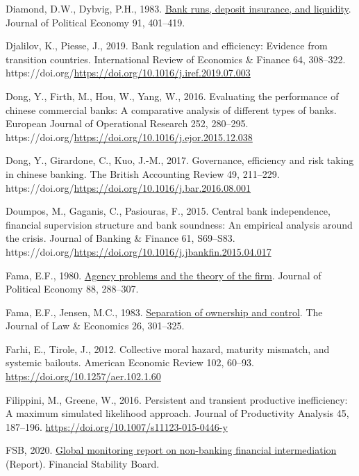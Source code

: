\documentclass[
  12pt,
  a4paper,
]{scrreprt}
\newlength{\cslhangindent}
\newenvironment{CSLReferences}[2] %
 {\begin{list}{}{%
  \setlength{\itemindent}{0pt}
  \setlength{\leftmargin}{0pt}
  \setlength{\parsep}{0pt}
  \ifodd #1
   \setlength{\leftmargin}{\cslhangindent}
   \setlength{\itemindent}{-1\cslhangindent}
  \fi
  \setlength{\itemsep}{#2\baselineskip}}}
 {\end{list}}
\begin{document}
\begin{CSLReferences}{1}{0}
Diamond, D.W., Dybvig, P.H., 1983.
\href{http://www.jstor.org/stable/1837095}{Bank runs, deposit insurance,
and liquidity}. Journal of Political Economy 91, 401--419.

Djalilov, K., Piesse, J., 2019. Bank regulation and efficiency: Evidence
from transition countries. International Review of Economics \& Finance
64, 308--322.
https://doi.org/\url{https://doi.org/10.1016/j.iref.2019.07.003}

Dong, Y., Firth, M., Hou, W., Yang, W., 2016. Evaluating the performance
of chinese commercial banks: A comparative analysis of different types
of banks. European Journal of Operational Research 252, 280--295.
https://doi.org/\url{https://doi.org/10.1016/j.ejor.2015.12.038}

Dong, Y., Girardone, C., Kuo, J.-M., 2017. Governance, efficiency and
risk taking in chinese banking. The British Accounting Review 49,
211--229.
https://doi.org/\url{https://doi.org/10.1016/j.bar.2016.08.001}

Doumpos, M., Gaganis, C., Pasiouras, F., 2015. Central bank
independence, financial supervision structure and bank soundness: An
empirical analysis around the crisis. Journal of Banking \& Finance 61,
S69--S83.
https://doi.org/\url{https://doi.org/10.1016/j.jbankfin.2015.04.017}

Fama, E.F., 1980. \href{http://www.jstor.org/stable/1837292}{Agency
problems and the theory of the firm}. Journal of Political Economy 88,
288--307.

Fama, E.F., Jensen, M.C., 1983.
\href{http://www.jstor.org/stable/725104}{Separation of ownership and
control}. The Journal of Law \& Economics 26, 301--325.

Farhi, E., Tirole, J., 2012. Collective moral hazard, maturity mismatch,
and systemic bailouts. American Economic Review 102, 60--93.
\url{https://doi.org/10.1257/aer.102.1.60}

Filippini, M., Greene, W., 2016. Persistent and transient productive
inefficiency: A maximum simulated likelihood approach. Journal of
Productivity Analysis 45, 187--196.
\url{https://doi.org/10.1007/s11123-015-0446-y}

FSB, 2020.
\href{https://www.fsb.org/wp-content/uploads/P161220.pdf}{Global
monitoring report on non-banking financial intermediation} (Report).
Financial Stability Board.


\end{CSLReferences}
\end{document}
